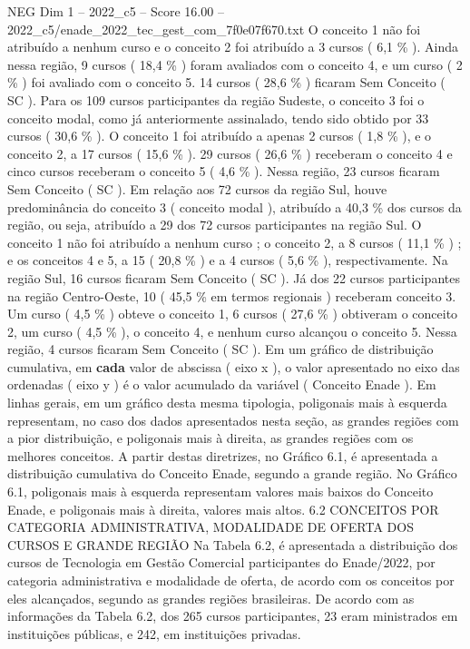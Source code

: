 \begin{textsample}{NEG Dim 1 – 2022\_c5 – Score 16.00 – 2022\_c5/enade\_2022\_tec\_gest\_com\_7f0e07f670.txt}
O conceito 1 não foi atribuído a nenhum curso e o conceito 2 foi atribuído a 3 cursos ( 6,1 \% ).
Ainda nessa região, 9 cursos ( 18,4 \% ) foram avaliados com o conceito 4, e um curso ( 2 \% ) foi avaliado com o conceito 5. 14 cursos ( 28,6 \% ) ficaram Sem Conceito ( SC ).
Para os 109 cursos participantes da região Sudeste, o conceito 3 foi o conceito modal, como já anteriormente assinalado, tendo sido obtido por 33 cursos ( 30,6 \% ).
O conceito 1 foi atribuído a apenas 2 cursos ( 1,8 \% ), e o conceito 2, a 17 cursos ( 15,6 \% ). 29 cursos ( 26,6 \% ) receberam o conceito 4 e cinco cursos receberam o conceito 5 ( 4,6 \% ).
Nessa região, 23 cursos ficaram Sem Conceito ( SC ).
Em relação aos 72 cursos da região Sul, houve predominância do conceito 3 ( conceito modal ), atribuído a 40,3 \% dos cursos da região, ou seja, atribuído a 29 dos 72 cursos participantes na região Sul.
O conceito 1 não foi atribuído a nenhum curso ; o conceito 2, a 8 cursos ( 11,1 \% ) ; e os conceitos 4 e 5, a 15 ( 20,8 \% ) e a 4 cursos ( 5,6 \% ), respectivamente.
Na região Sul, 16 cursos ficaram Sem Conceito ( SC ).
Já dos 22 cursos participantes na região Centro-Oeste, 10 ( 45,5 \% em termos regionais ) receberam conceito 3.
Um curso ( 4,5 \% ) obteve o conceito 1, 6 cursos ( 27,6 \% ) obtiveram o conceito 2, um curso ( 4,5 \% ), o conceito 4, e nenhum curso alcançou o conceito 5.
Nessa região, 4 cursos ficaram Sem Conceito ( SC ).
Em um gráfico de distribuição cumulativa, em \textbf{cada} valor de abscissa ( eixo x ), o valor apresentado no eixo das ordenadas ( eixo y ) é o valor acumulado da variável ( Conceito Enade ).
Em linhas gerais, em um gráfico desta mesma tipologia, poligonais mais à esquerda representam, no caso dos dados apresentados nesta seção, as grandes regiões com a pior distribuição, e poligonais mais à direita, as grandes regiões com os melhores conceitos.
A partir destas diretrizes, no Gráfico 6.1, é apresentada a distribuição cumulativa do Conceito Enade, segundo a grande região.
No Gráfico 6.1, poligonais mais à esquerda representam valores mais baixos do Conceito Enade, e poligonais mais à direita, valores mais altos. 6.2 CONCEITOS POR CATEGORIA ADMINISTRATIVA, MODALIDADE DE OFERTA DOS CURSOS E GRANDE REGIÃO Na Tabela 6.2, é apresentada a distribuição dos cursos de Tecnologia em Gestão Comercial participantes do Enade/2022, por categoria administrativa e modalidade de oferta, de acordo com os conceitos por eles alcançados, segundo as grandes regiões brasileiras.
De acordo com as informações da Tabela 6.2, dos 265 cursos participantes, 23 eram ministrados em instituições públicas, e 242, em instituições privadas.

\end{textsample}
